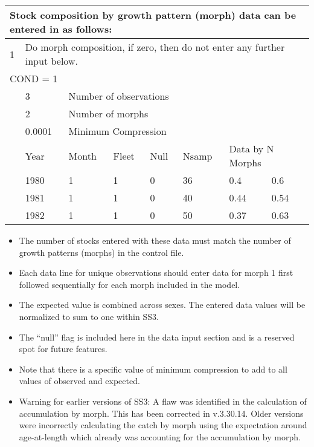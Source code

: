 \begin{center}
	\begin{tabular}{p{1.1cm} p{1.1cm} p{1.1cm} p{1.1cm} p{1.1cm} p{1.1cm} p{1.1cm} p{3.5cm}}
		\multicolumn{8}{l}{Stock composition by growth pattern (morph) data can be entered in as follows:} \\
		\hline
		1 &  \multicolumn{7}{l}{Do morph composition, if zero, then do not enter any further input below.} \Tstrut\Bstrut\\
		\hline
		\multicolumn{8}{l}{COND = 1} \Tstrut\\ 
		& 3 & \multicolumn{6}{l}{Number of observations} \Bstrut\\
		\hline
		& 2 & \multicolumn{6}{l}{Number of morphs} \Tstrut\Bstrut\\
		\hline
		& 0.0001 & \multicolumn{6}{l}{Minimum Compression} \Tstrut\Bstrut\\
		\hline
		& Year & Month & Fleet & Null & Nsamp & \multicolumn{2}{l}{Data by N Morphs} \Tstrut\Bstrut\\
		\hline
		& 1980 & 1 & 1 & 0 & 36 & 0.4 & 0.6 \Tstrut\\
		& 1981 & 1 & 1 & 0 & 40 & 0.44 & 0.54 \\
		& 1982 & 1 & 1 & 0 & 50 & 0.37 & 0.63 \Bstrut\\
		\hline
	\end{tabular}
\end{center}

	\begin{itemize}
		\item The number of stocks entered with these data must match the number of growth patterns (morphs) in the control file.
		\item Each data line for unique observations should enter data for morph 1 first followed sequentially for each morph included in the model.
		\item The expected value is combined across sexes. The entered data values will be normalized to sum to one within SS3.
		\item The ``null'' flag is included here in the data input section and is a reserved spot for future features. 
		\item Note that there is a specific value of minimum compression to add to all values of observed and expected.
		\item Warning for earlier versions of SS3: A flaw was identified in the calculation of accumulation by morph. This has been corrected in v.3.30.14. Older versions were incorrectly calculating the catch by morph using the expectation around age-at-length which already was accounting for the accumulation by morph.   
	\end{itemize}

